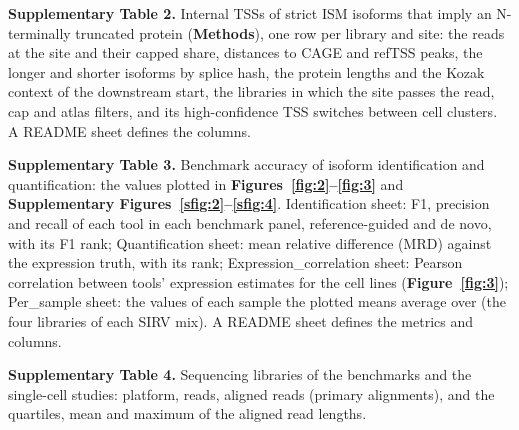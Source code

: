 \noindent\textbf{Supplementary Table 2.} Internal TSSs of strict ISM isoforms that imply an N-terminally truncated protein (\textbf{Methods}), one row per library and site: the reads at the site and their capped share, distances to CAGE and refTSS peaks, the longer and shorter isoforms by splice hash, the protein lengths and the Kozak context of the downstream start, the libraries in which the site passes the read, cap and atlas filters, and its high-confidence TSS switches between cell clusters. A README sheet defines the columns.

\noindent\textbf{Supplementary Table 3.} Benchmark accuracy of isoform identification and quantification: the values plotted in \textbf{Figures~\ref{fig:2}--\ref{fig:3}} and \textbf{Supplementary Figures~\ref{sfig:2}--\ref{sfig:4}}. Identification sheet: F1, precision and recall of each tool in each benchmark panel, reference-guided and de novo, with its F1 rank; Quantification sheet: mean relative difference (MRD) against the expression truth, with its rank; Expression\_correlation sheet: Pearson correlation between tools' expression estimates for the cell lines (\textbf{Figure~\ref{fig:3}}); Per\_sample sheet: the values of each sample the plotted means average over (the four libraries of each SIRV mix). A README sheet defines the metrics and columns.

\noindent\textbf{Supplementary Table 4.} Sequencing libraries of the benchmarks and the single-cell studies: platform, reads, aligned reads (primary alignments), and the quartiles, mean and maximum of the aligned read lengths.
